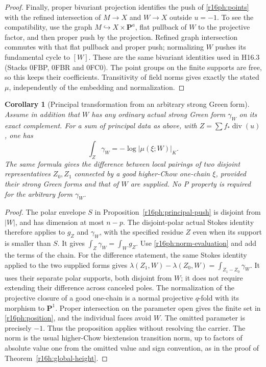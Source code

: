 \documentclass[11pt,a4paper]{article}
\newtheorem{corollary}[theorem]{Corollary}
\theoremstyle{definition}
\theoremstyle{remark}
\numberwithin{equation}{section}
\begin{document}
\begin{proof}
Finally, proper bivariant projection identifies the push of
\eqref{r16ph:points} with the refined intersection of $M\to X$
and $W\to X$ outside $u=-1$.  To see the compatibility, use the
graph $M\hookrightarrow X\times\mathbf P^a$, flat pullback
of $W$ to the projective factor, and then proper push by the
projection.  Refined graph intersection commutes with that flat
pullback and proper push; normalizing $W$ pushes its fundamental
cycle to $[W]$.  These are the same bivariant identities used
in H16.3 (Stacks 0FBP, 0FBR and 0FC0).  The point groups on the
finite supports are free, so this keeps their coefficients.
Transitivity of field norms gives exactly the stated $\mu$,
independently of the embedding and normalization.
\end{proof}

\begin{corollary}[Principal transformation from an arbitrary strong Green form]
\label{r16ph:principal-law}
Assume in addition that $W$ has any ordinary actual strong Green
form $\gamma_W$ on its exact complement.  For a sum of principal
data as above, with $Z=\sum f_*\operatorname{div}(u)$, one has
\[
                   \int_Z\gamma_W
                       =-\log|\mu(\xi;W)|_K.
 \tag{PH16.9}\label{r16ph:principal-law-eq}
\]
The same formula gives the difference between local pairings of
two disjoint representatives $Z_0,Z_1$ connected by a good
higher-Chow one-chain $\xi$, provided their strong Green forms
and that of $W$ are supplied.  No P property is required for
the arbitrary form $\gamma_W$.
\end{corollary}

\begin{proof}
The polar envelope $S$ in Proposition~\ref{r16ph:principal-push}
is disjoint from $|W|$, and has dimension at most $n-p$.
The disjoint-polar actual Stokes identity therefore applies
to $g_Z$ and $\gamma_W$, with the specified residue $Z$ even when
its support is smaller than $S$.  It gives
$\int_Z\gamma_W=\int_W g_Z$.
Use \eqref{r16ph:norm-evaluation} and add the terms of the chain.
For the difference statement, the same Stokes identity applied to
the two supplied forms gives
$\lambda(Z_1,W)-\lambda(Z_0,W)=\int_{Z_1-Z_0}\gamma_W$.
It uses their separate polar supports, both disjoint from $W$;
it does not require extending their difference across canceled
poles.  The normalization of the projective closure of a good
one-chain is a normal projective $q$-fold with its morphism to
$\mathbf P^1$.  Proper intersection on the parameter open
gives the finite set in \eqref{r16ph:position}, and the individual
faces avoid $W$.  The omitted parameter is precisely $-1$.
Thus the proposition applies without resolving the carrier.
The norm is the usual higher-Chow biextension transition norm,
up to factors of absolute value one from the omitted value and
sign convention, as in the proof of Theorem~\ref{r16h:global-height}.
\end{proof}
\end{document}
